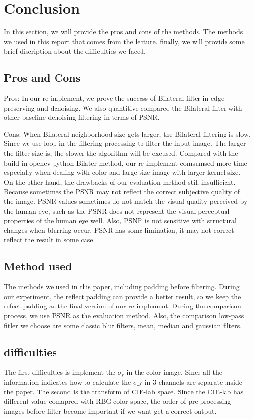 \documentclass[12pt]{article}
\begin{document}
\section{Conclusion}
\label{section conclusion}
In this section, we will provide the pros and cons of the methods.
The methods we used in this report that comes from the lecture.
finally, we will provide some brief discription about the difficulties we faced.

\subsection{Pros and Cons}
Pros:
In our re-implement, we prove the success of Bilateral filter in edge preserving and  denoising. 
We also quantitive compared the Bilateral filter with other baseline denoising filtering in terms of PSNR. 

Cons:
When Bilateral neighborhood size gets larger, the Bilateral filtering is slow.
Since we use loop in the filtering processing to filter the input image. 
The larger the filter size is, the slower the algorithm will be excused.
Compared with the build-in opencv-python Bilater method, our re-implement comsumsed more time especially when dealing with color and large size image with larger kernel size.
On the other hand, the drawbacks of our evaluation method still insufficient. 
Because sometimes the PSNR may not reflect the correct subjective quality of the image.
PSNR values sometimes do not match the visual quality perceived by the human eye, such as the PSNR does not represent the visual perceptual properties of the human eye well.
Also, PSNR is not sensitive with structural changes when blurring occur.  
PSNR has some limination, it may not correct reflect the result in some case.

\subsection{Method used}

The methods we used in this paper, including padding before filtering. 
During our experiment, the reflect padding can provide a better result, so we keep the refect padding as the final version of our re-implement.
During the comparison process, we use PSNR as the evaluation method.
Also, the comparison low-pass fitler we choose are some classic blur filters, mean, median and gaussian filters.

\subsection{difficulties}

The first difficulties is implement the $\sigma_r$ in the color image. 
Since all the information indicates how to calculate the $\sigma\_r$ in 3-channels are separate inside the paper.
The second is the transform of CIE-lab space.
Since the CIE-lab has different value comapred with RBG color space, the order of pre-processing images before filter become important if we want get a correct output.
\end{document}
